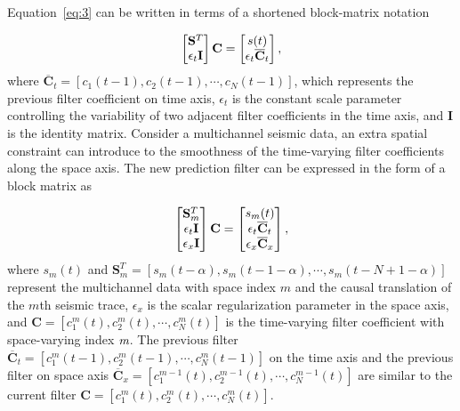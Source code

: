 Equation~\ref{eq:3} can be written in terms of a shortened block-matrix
notation

\begin{equation}
  \label{eq:4}
 \begin{bmatrix}
 \mathbf{S}^T \cr \epsilon_t\mathbf{I}
  \end{bmatrix}
  \mathbf{C}=
 \begin{bmatrix}
 s(t) \cr \epsilon_t\overline{\mathbf{C}}_t
 \end{bmatrix},
\end{equation}
where $\overline{\mathbf{C}}_t=[c_1(t-1),c_2(t-1),\cdots,c_N(t-1)]$, which
represents the previous filter coefficient on time axis, $\epsilon_t$ is
the constant scale parameter controlling the variability of two adjacent
filter coefficients in the time axis, and $\mathbf{I}$ is the identity
matrix. Consider a multichannel seismic data, an extra spatial constraint
can introduce to the smoothness of the time-varying filter coefficients
along the space axis. The new prediction filter can be expressed in the
form of a block matrix as

\begin{equation}
  \label{eq:5}  
 \begin{bmatrix}
 \mathbf{S}_m^T \cr \epsilon_t\mathbf{I} \cr \epsilon_x\mathbf{I}
 \end{bmatrix}
 \mathbf{C}=
 \begin{bmatrix}
 s_m(t) \cr \epsilon_t\overline{\mathbf{C}}_t \cr
   \epsilon_x\overline{\mathbf{C}}_x
  \end{bmatrix},
\end{equation}
where $s_m(t)$ and
$\mathbf{S}_m^T=[s_m(t-\alpha),s_m(t-1-\alpha),\cdots,s_m(t-N+1-\alpha)]$
represent the multichannel data with space index $m$ and the causal
translation of the $m$th seismic trace, $\epsilon_x$ is the scalar
regularization parameter in the space axis, and
$\mathbf{C}=[c_1^m(t),c_2^m(t),\cdots,c_N^m(t)]$ is the time-varying filter
coefficient with space-varying index $\emph{m}$. The previous filter
$\overline{\mathbf{C}}_t=[c_1^m(t-1),c_2^m(t-1),\cdots,c_N^m(t-1)]$ on the 
time axis and the previous filter on space axis
$\overline{\mathbf{C}}_x=[c_1^{m-1}(t),c_2^{m-1}(t),\cdots,c_N^{m-1}(t)]$ are
similar to the current filter
$\mathbf{C}=[c_1^m(t),c_2^m(t),\cdots,c_N^m(t)]$.

